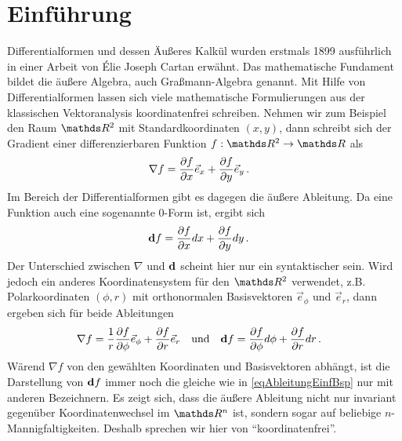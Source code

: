 \setcounter{chapter}{-1}
\setcounter{page}{-1} 
\chapter{Einführung}

Differentialformen und dessen Äußeres Kalkül wurden erstmals 1899 ausführlich in einer Arbeit von \'{E}lie Joseph Cartan \cite{cartan} erwähnt.
Das mathematische Fundament bildet die äußere Algebra, auch Graßmann-Algebra genannt.
Mit Hilfe von Differentialformen lassen sich viele mathematische Formulierungen aus der klassischen Vektoranalysis koordinatenfrei schreiben.
Nehmen wir zum Beispiel den Raum \( \R^{2} \) mit Standardkoordinaten \( (x,y) \), dann schreibt sich der Gradient einer differenzierbaren Funktion 
\( f:\R^{2}\rightarrow \R \) als
\begin{align}
  \nabla f &= \frac{\partial f}{\partial x} \vec{e}_{x} + \frac{\partial f}{\partial y} \vec{e}_{y} \,\text{.}
\end{align}
Im Bereich der Differentialformen gibt es dagegen die äußere Ableitung.
Da eine Funktion auch eine sogenannte 0-Form ist, ergibt sich
\begin{align}
  \label{eqAbleitungEinfBsp}
  \mathbf{d} f &= \frac{\partial f}{\partial x} dx + \frac{\partial f}{\partial y} dy \,\text{.}
\end{align}
Der Unterschied zwischen \( \nabla \) und \( \mathbf{d} \) scheint hier nur ein syntaktischer sein.
Wird jedoch ein anderes Koordinatensystem für den \( \R^{2} \) verwendet, z.B. Polarkoordinaten \((\phi , r)\) mit orthonormalen Basisvektoren 
\(  \vec{e}_{\phi} \) und \( \vec{e}_{r} \),
dann ergeben sich für beide Ableitungen
\begin{align}
  \nabla f &= \frac{1}{r}\frac{\partial f}{\partial \phi} \vec{e}_{\phi} + \frac{\partial f}{\partial r} \vec{e}_{r} \quad\text{und}\quad 
  \mathbf{d} f = \frac{\partial f}{\partial \phi} d\phi + \frac{\partial f}{\partial r} dr \,\text{.}
\end{align}
Wärend \( \nabla f \) von den gewählten Koordinaten und Basisvektoren abhängt, ist die Darstellung von \( \mathbf{d} f \) immer noch die gleiche wie in 
\eqref{eqAbleitungEinfBsp} nur mit anderen Bezeichnern.
Es zeigt sich, dass die äußere Ableitung nicht nur invariant gegenüber Koordinatenwechsel im \( \R^{n} \) ist, sondern sogar auf beliebige \( n \)-Mannigfaltigkeiten.
Deshalb sprechen wir hier von "`koordinatenfrei"'.

